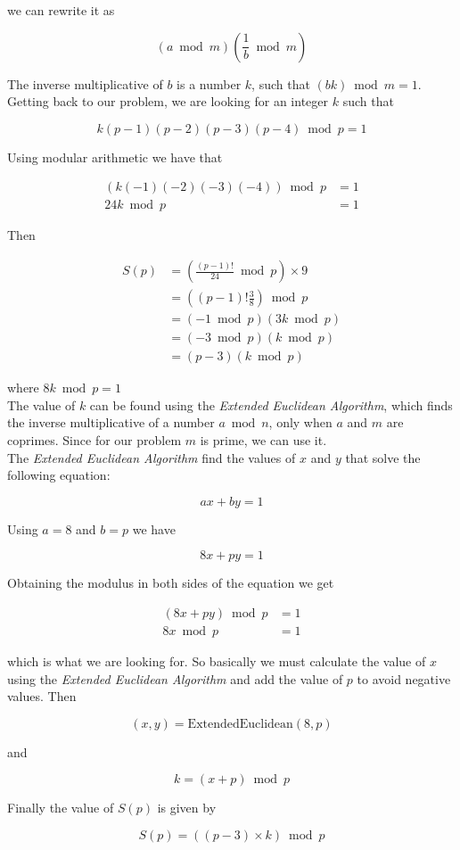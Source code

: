 we can rewrite it as

$$
\left ( a \bmod m \right ) \left ( \frac{1}{b} \bmod m \right )
$$

The inverse multiplicative of $b$ is a number $k$, such that $(bk) \bmod m = 1$. Getting back to our problem, we are looking for an integer $k$ such that

$$
k(p-1)(p-2)(p-3)(p-4) \bmod p = 1
$$

Using modular arithmetic we have that

\begin{align*}
    (k(-1)(-2)(-3)(-4)) \bmod p &= 1 \\
    24k \bmod p &= 1
\end{align*}

Then 

\begin{align*}
    S(p) &= \left ( \frac{(p-1)!}{24} \bmod{p} \right ) \times 9 \\
    &= \left ( (p-1)! \frac{3}{8} \right ) \bmod p \\
    &= (-1 \bmod p) (3k \bmod p) \\
    &= (-3 \bmod p) (k \bmod p)\\
    &= (p-3)(k \bmod p)
\end{align*}

where $8k \bmod p = 1$\\

The value of $k$ can be found using the \textit{Extended Euclidean Algorithm}, which finds the inverse multiplicative of a number $a \bmod n$, only when $a$ and $m$ are coprimes. Since for our problem $m$ is prime, we can use it.\\

The \textit{Extended Euclidean Algorithm} find the values of $x$ and $y$ that solve the following equation:

$$
ax + by = 1
$$

Using $a=8$ and $b=p$ we have

$$
8x + py = 1
$$

Obtaining the modulus in both sides of the equation we get

\begin{align*}
    (8x + py) \bmod p &= 1 \\
    8x \bmod p &= 1
\end{align*}

which is what we are looking for. So basically we must calculate the value of $x$ using the \textit{Extended Euclidean Algorithm} and add the value of $p$ to avoid negative values. Then

$$
(x,y) = \mbox{ExtendedEuclidean}(8,p)
$$

and

$$
k = \left (x + p \right ) \bmod p
$$

Finally the value of $S(p)$ is given by

$$
S(p) = \left ( (p-3) \times k \right ) \bmod p
$$